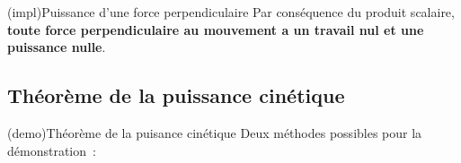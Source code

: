 \documentclass[../../main/main.tex]{subfiles}
\begin{document}
\begin{tcb*}(impl){Puissance d'une force perpendiculaire}
	Par conséquence du produit scalaire, \textbf{toute force perpendiculaire au
		mouvement a un travail nul et une puissance nulle}.
\end{tcb*}

\vspace{-15pt}
\subsection{Théorème de la puissance cinétique}

\begin{tcb*}(demo){Théorème de la puisance cinétique}
	Deux méthodes possibles pour la démonstration~:
	\smallbreak
	\begin{isd}[sidebyside align=top]
		\vspace*{-15pt}
		\vspace{-15pt}
		\tcblower
		\vspace*{-15pt}
		\vspace{-15pt}
	\end{isd}
\end{tcb*}
\end{document}

